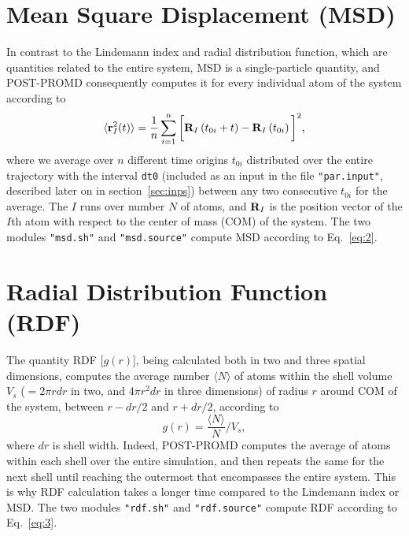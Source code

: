 \documentclass[11pt]{article}
\begin{document}
\section*{\label{sec:msd}Mean Square Displacement (MSD)}
In contrast to the Lindemann index and radial distribution function, which are quantities related to the entire system, MSD is a single-particle quantity, and POST-PROMD consequently computes it for every individual atom of the system according to 
\begin{equation}
	\label{eq:2}
	\langle{{\bf{r}}_{I}^{2}(t)\rangle}=\frac{1}{n}\sum_{i=1}^{n}\bigg[{\bf{R}}_{I}\left(t_{0i}+t\right)-{\bf{R}}_{I}\left(t_{0i}\right)\bigg]^{2},
\end{equation}
where we average over $n$ different time origins $t_{0i}$ distributed over the entire trajectory with the interval {\texttt{dt0}} (included as an input in the file {\texttt{"par.input"}}, described later on in section~\ref{sec:inps}) between any two consecutive $t_{0i}$ for the average. The $I$ runs over number $N$ of atoms, and ${\bf{R}}_{I}$ is the position vector of the $I$th atom with respect to the center of mass (COM) of the system. The two modules {\texttt{"msd.sh"}} and {\texttt{"msd.source"}} compute MSD according to Eq.~\ref{eq:2}.
\section*{Radial Distribution Function (RDF)}
The quantity RDF [$g(r)$], being calculated both in two and three spatial dimensions, computes the average number $\langle{N}\rangle$ of atoms within the shell volume $V_s$ ($=2\pi rdr$ in two, and $4\pi r^{2}dr$ in three dimensions) of radius $r$ around COM of the system, between $r-dr/2$ and $r+dr/2$, according to\vspace{3mm}
\begin{equation}
	\label{eq:3}
	g(r)=\frac{\langle{N}\rangle}{N}\bigg/V_s,
\end{equation}
where $dr$ is shell width. Indeed, POST-PROMD computes the average of atoms within each shell over the entire simulation, and then repeats the same for the next shell until reaching the outermost that encompasses the entire system. This is why RDF calculation takes a longer time compared to the Lindemann index or MSD. The two modules {\texttt{"rdf.sh"}} and {\texttt{"rdf.source"}} compute RDF according to Eq.~\ref{eq:3}.
\end{document}
